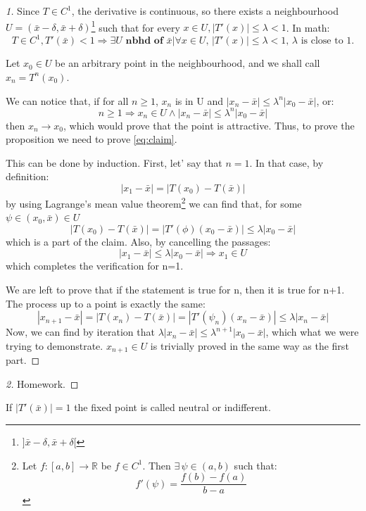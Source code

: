 \begin{proof}[1]
Since $T\in C^1$, the derivative is continuous, so there exists a neighbourhood $U=(\bar{x}-\delta, \bar{x}+\delta)$\footnote{$]\bar{x}-\delta, \bar{x}+\delta[$} such that for every $ x\in U, |T'(x)|\leq\lambda<1$. In math:
\begin{equation*}
    T\in C^1, T'(\bar{x})<1\Rightarrow\exists U \textbf{ nbhd of } \bar{x}|\forall x\in U,\, |T'(x)|\leq\lambda<1,\, \lambda \text{ is close to 1.}
\end{equation*}

Let $x_0\in U$ be an arbitrary point in the neighbourhood, and we shall call $x_n=T^n(x_0)$.

We can notice that, if for all $n\geq1$, $x_n$ is in U and $|x_n-\bar{x}|\leq\lambda^n|x_0-\bar{x}|$, or:
\begin{equation}
    n\geq1\Rightarrow x_n\in U \land |x_n-\bar{x}|\leq\lambda^n|x_0-\bar{x}| 
    \label{eq:claim}
\end{equation} 
then $x_n\rightarrow x_0$, which would prove that the point is attractive. Thus, to prove the proposition we need to prove \autoref{eq:claim}.

This can be done by induction.
First, let' say that $n=1$. In that case, by definition:
\begin{equation*}
    |x_1-\bar{x}|=|T(x_0)-T(\bar{x})|
\end{equation*}
by using Lagrange's mean value theorem\footnote{Let $f \colon [a, b] \to \mathbb{R}$ be $f\in C^1$.  Then $\exists \, \psi \in (a, b)$ such that:
\[
f'(\psi) = \frac{f(b) - f(a)}{b - a}
\]} we can find that, for some $\psi\in(x_0, \bar{x})\in U$\begin{equation*}
    |T(x_0)-T(\bar{x})|=|T'(\phi)(x_0-\bar{x})|\leq\lambda|x_0-\bar{x}|
\end{equation*}
which is a part of the claim. Also, by cancelling the passages:
\begin{equation*}
    |x_1-\bar{x}|\leq\lambda|x_0-\bar{x}|\Rightarrow x_1\in U
\end{equation*}
which completes the verification for n=1.

We are left to prove that if the statement is true for n, then it is true for n+1. The process up to a point is exactly the same: \begin{equation*}
    |x_{n+1}-\bar{x}|=|T(x_n)-T(\bar{x})|=|T'(\psi_n)(x_n-\bar{x})|\leq\lambda|x_n-\bar{x}|
\end{equation*}
Now, we can find by iteration that $\lambda|x_n-\bar{x}|\leq \lambda^{n+1}|x_0-\bar{x}|$, which what we were trying to demonstrate. $x_{n+1}\in U$ is trivially proved in the same way as the first part. 
\end{proof}
\begin{proof}[2]
    Homework.
\end{proof}
\begin{definition}
    If $|T'(\bar{x})|=1$ the fixed point is called neutral or indifferent.
\end{definition}
